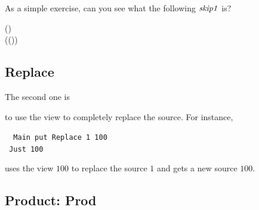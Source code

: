 As a simple exercise, can you see what the following \ensuremath{\Varid{skip1}} is? 
\begin{hscode}\SaveRestoreHook
{}%
%
\>[B]{}\mathbin{::}\;\;(){}\<[E]%
\\
\>[B]{}\mathrel{=}\;(\;()){}\<[E]%
\ColumnHook
\end{hscode}\resethooks

\subsection{Replace}

The second one is
\begin{hscode}\SaveRestoreHook
{}%
%
%
%
\>[3]{}\<[12]%
\>[12]{}\mathbin{::}\;\;\<[E]%
\ColumnHook
\end{hscode}\resethooks
to use the view to completely replace the source. For instance,
\begin{tabbing}\tt
~Main~put~Replace~1~100\\
\tt ~Just~100
\end{tabbing}
uses the view \ensuremath{\mathrm{100}} to replace the source \ensuremath{\mathrm{1}} and gets a new source \ensuremath{\mathrm{100}}.

\subsection{Product: Prod}


